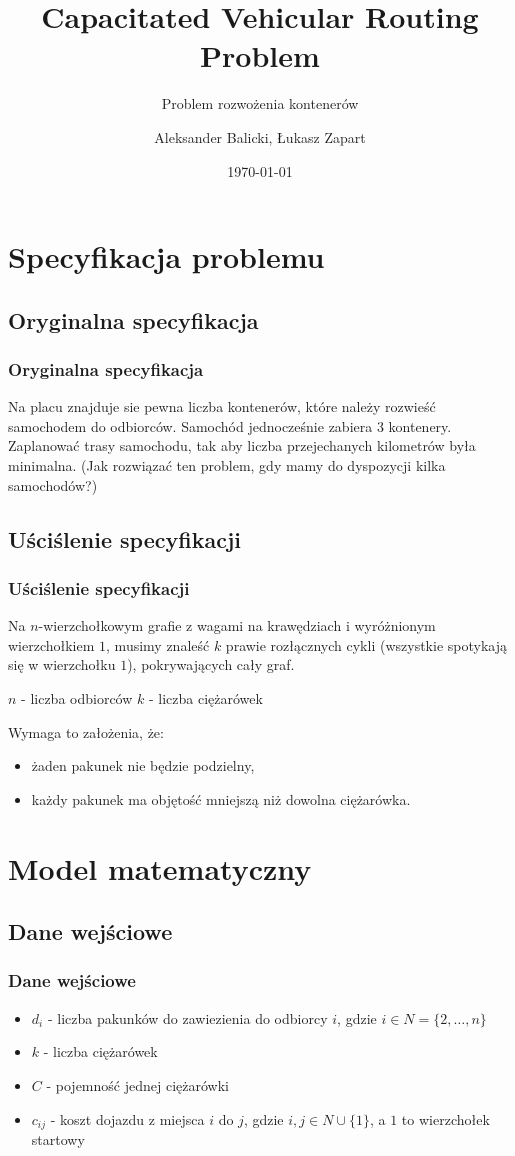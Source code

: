 \documentclass{beamer}
\title{Capacitated Vehicular Routing Problem}
\subtitle{Problem rozwożenia kontenerów}
\author{Aleksander Balicki, Łukasz Zapart}
\institute{Instytut Informatyki}
\date{\today}
\begin{document}
\mode*
\begin{frame}
\titlepage
\end{frame}

\begin{frame}
\tableofcontents[hideallsubsections]
\end{frame}


\section{Specyfikacja problemu}
\subsection{Oryginalna specyfikacja}
\begin{frame}
\frametitle{Oryginalna specyfikacja}
	Na placu znajduje sie pewna liczba kontenerów, które należy rozwieść samochodem do odbiorców. Samochód jednocześnie zabiera 3 kontenery. Zaplanować trasy samochodu, tak aby liczba przejechanych kilometrów była minimalna. (Jak rozwiązać ten problem, gdy mamy do dyspozycji kilka samochodów?)
\end{frame}

\subsection{Uściślenie specyfikacji}
\begin{frame}
\frametitle{Uściślenie specyfikacji}
	Na $n$-wierzchołkowym grafie z wagami na krawędziach i wyróżnionym wierzchołkiem $1$, musimy znaleść $k$ prawie rozłącznych cykli (wszystkie spotykają się w wierzchołku $1$), pokrywających cały graf.

	$n$ - liczba odbiorców
	$k$ - liczba ciężarówek

	Wymaga to założenia, że:
	\begin{itemize}
		\item żaden pakunek nie będzie podzielny,
		\item każdy pakunek ma objętość mniejszą niż dowolna ciężarówka.
	\end{itemize}
\end{frame}

\section{Model matematyczny}
\subsection{Dane wejściowe}
\begin{frame}
\frametitle{Dane wejściowe}
\begin{itemize}
    \item $d_i$ - liczba pakunków do zawiezienia do odbiorcy $i$, gdzie $i \in N = \{2, \dots, n\}$
    \item $k$ - liczba ciężarówek
    \item $C$ - pojemność jednej ciężarówki
    \item $c_{ij}$ - koszt dojazdu z miejsca $i$ do $j$, gdzie $i, j \in N \cup \{1\}$, a $1$ to wierzchołek startowy
\end{itemize}
\end{frame}
\end{document}
